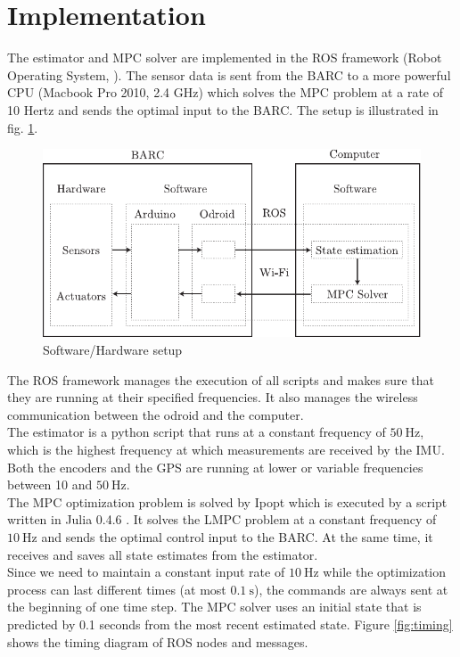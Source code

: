 \section{Implementation}
The estimator and MPC solver are implemented in the ROS framework (Robot Operating System, \cite{ros}). The sensor data is sent from the BARC to a more powerful CPU (Macbook Pro 2010, 2.4 GHz) which solves the MPC problem at a rate of 10 Hertz and sends the optimal input to the BARC. The setup is illustrated in fig. \ref{fig:architecture}.
\begin{figure}[ht]
    \centering
      \includegraphics{../../Figures/Illustrator/Architecture.pdf}
    \caption{Software/Hardware setup}
    \label{fig:architecture}
\end{figure}
The ROS framework manages the execution of all scripts and makes sure that they are running at their specified frequencies. It also manages the wireless communication between the odroid and the computer.\\
The estimator is a python script that runs at a constant frequency of $\SI{50}{\hertz}$, which is the highest frequency at which measurements are received by the IMU. Both the encoders and the GPS are running at lower or variable frequencies between 10 and $\SI{50}{\hertz}$.\\
The MPC optimization problem is solved by Ipopt \cite{ipopt} which is executed by a script written in Julia 0.4.6 \cite{julia}. It solves the LMPC problem at a constant frequency of $\SI{10}{\hertz}$ and sends the optimal control input to the BARC. At the same time, it receives and saves all state estimates from the estimator.\\
Since we need to maintain a constant input rate of $\SI{10}{\hertz}$ while the optimization process can last different times (at most $\SI{0.1}{\second}$), the commands are always sent at the beginning of one time step. The MPC solver uses an initial state that is predicted by 0.1 seconds from the most recent estimated state. Figure \ref{fig:timing} shows the timing diagram of ROS nodes and messages.
